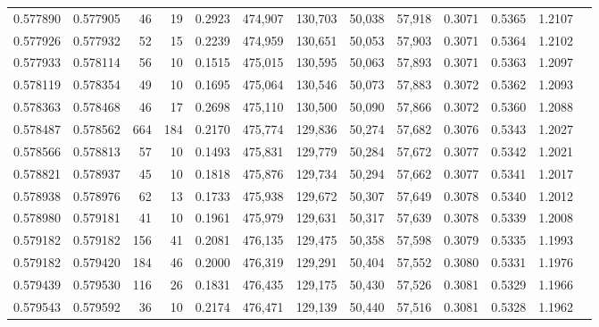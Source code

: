 \begin{tabular}{rrrrrrrrrrrrr}
0.577890 & 0.577905 &    46 &  19 &                                     0.2923 & 474,907 & 130,703 &  50,038 &  57,918 & 0.3071 & 0.5365 & 1.2107 \\
0.577926 & 0.577932 &    52 &  15 &                                     0.2239 & 474,959 & 130,651 &  50,053 &  57,903 & 0.3071 & 0.5364 & 1.2102 \\
0.577933 & 0.578114 &    56 &  10 &                                     0.1515 & 475,015 & 130,595 &  50,063 &  57,893 & 0.3071 & 0.5363 & 1.2097 \\
0.578119 & 0.578354 &    49 &  10 &                                     0.1695 & 475,064 & 130,546 &  50,073 &  57,883 & 0.3072 & 0.5362 & 1.2093 \\
0.578363 & 0.578468 &    46 &  17 &                                     0.2698 & 475,110 & 130,500 &  50,090 &  57,866 & 0.3072 & 0.5360 & 1.2088 \\
0.578487 & 0.578562 &   664 & 184 &                                     0.2170 & 475,774 & 129,836 &  50,274 &  57,682 & 0.3076 & 0.5343 & 1.2027 \\
0.578566 & 0.578813 &    57 &  10 &                                     0.1493 & 475,831 & 129,779 &  50,284 &  57,672 & 0.3077 & 0.5342 & 1.2021 \\
0.578821 & 0.578937 &    45 &  10 &                                     0.1818 & 475,876 & 129,734 &  50,294 &  57,662 & 0.3077 & 0.5341 & 1.2017 \\
0.578938 & 0.578976 &    62 &  13 &                                     0.1733 & 475,938 & 129,672 &  50,307 &  57,649 & 0.3078 & 0.5340 & 1.2012 \\
0.578980 & 0.579181 &    41 &  10 &                                     0.1961 & 475,979 & 129,631 &  50,317 &  57,639 & 0.3078 & 0.5339 & 1.2008 \\
0.579182 & 0.579182 &   156 &  41 &                                     0.2081 & 476,135 & 129,475 &  50,358 &  57,598 & 0.3079 & 0.5335 & 1.1993 \\
0.579182 & 0.579420 &   184 &  46 &                                     0.2000 & 476,319 & 129,291 &  50,404 &  57,552 & 0.3080 & 0.5331 & 1.1976 \\
0.579439 & 0.579530 &   116 &  26 &                                     0.1831 & 476,435 & 129,175 &  50,430 &  57,526 & 0.3081 & 0.5329 & 1.1966 \\
0.579543 & 0.579592 &    36 &  10 &                                     0.2174 & 476,471 & 129,139 &  50,440 &  57,516 & 0.3081 & 0.5328 & 1.1962 \\

\end{tabular}
